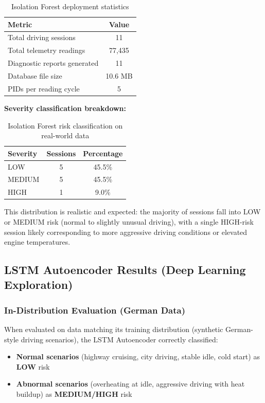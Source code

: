 \begin{table}[h]
\centering
\begin{tabular}{|l|c|}
\hline
\textbf{Metric} & \textbf{Value} \\
\hline
Total driving sessions & 11 \\
\hline
Total telemetry readings & 77,435 \\
\hline
Diagnostic reports generated & 11 \\
\hline
Database file size & 10.6 MB \\
\hline
PIDs per reading cycle & 5 \\
\hline
\end{tabular}
\caption{Isolation Forest deployment statistics}
\label{tab:iforest_deployment}
\end{table}

\textbf{Severity classification breakdown:}

\begin{table}[h]
\centering
\begin{tabular}{|l|c|c|}
\hline
\textbf{Severity} & \textbf{Sessions} & \textbf{Percentage} \\
\hline
LOW & 5 & 45.5\% \\
\hline
MEDIUM & 5 & 45.5\% \\
\hline
HIGH & 1 & 9.0\% \\
\hline
\end{tabular}
\caption{Isolation Forest risk classification on real-world data}
\label{tab:iforest_risk}
\end{table}

This distribution is realistic and expected: the majority of sessions fall into LOW or MEDIUM risk (normal to slightly unusual driving), with a single HIGH-risk session likely corresponding to more aggressive driving conditions or elevated engine temperatures.

\subsection{LSTM Autoencoder Results (Deep Learning Exploration)}

\subsubsection{In-Distribution Evaluation (German Data)}

When evaluated on data matching its training distribution (synthetic German-style driving scenarios), the LSTM Autoencoder correctly classified:
\begin{itemize}
    \item \textbf{Normal scenarios} (highway cruising, city driving, stable idle, cold start) as \textbf{LOW} risk
    \item \textbf{Abnormal scenarios} (overheating at idle, aggressive driving with heat buildup) as \textbf{MEDIUM/HIGH} risk
\end{itemize}


